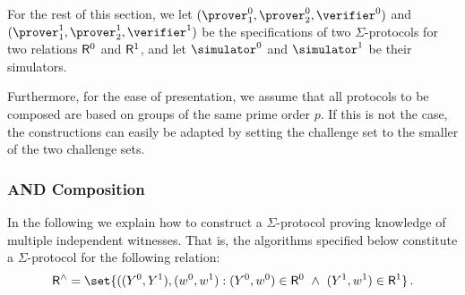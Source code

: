 \documentclass[runningheads,11pt]{article}
\begin{document}
  For the rest of this section, we let $(\prover_1^0,\prover_2^0,\verifier^0)$ and $(\prover_1^1,\prover_2^1,\verifier^1)$ be the specifications of two $\Sigma$-protocols for two relations $\mathsf{R}^0$ and $\mathsf{R}^1$, and let $\simulator^0$ and $\simulator^1$ be their simulators.

  Furthermore, for the ease of presentation, we assume that all protocols to be composed are based on groups of the same prime order $p$.
  If this is not the case, the constructions can easily be adapted by setting the challenge set to the smaller of the two challenge sets.

\subsubsection{AND Composition}
  In the following we explain how to construct a $\Sigma$-protocol proving knowledge of multiple independent witnesses.
  That is, the algorithms specified below constitute a $\Sigma$-protocol for the following relation:
\[
  \relation^\land = \set{
    ((\statement^0,\statement^1),(\witness^0,\witness^1) : (\statement^0,\witness^0)\in \relation^0 ~\land~ (\statement^1,\witness^1)\in\relation^1}\,.
\]
\end{document}
